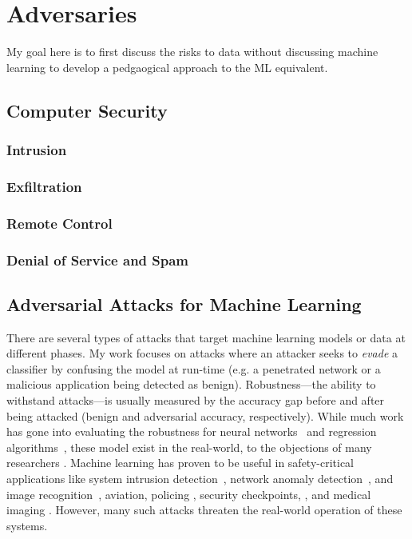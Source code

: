 \chapter{Adversaries}
My goal here is to first discuss the risks to data without discussing machine learning to develop a pedgaogical approach to the ML equivalent.
\section{Computer Security}
\lipsum[1-2]
\subsection{Intrusion}
\lipsum[1-2]
\subsection{Exfiltration}
\lipsum[1-2]
\subsection{Remote Control}
\lipsum[1-2]
\subsection{Denial of Service and Spam}
\lipsum[1-2]

\section{Adversarial Attacks for Machine Learning}
\label{sec:attacks}
There are several types of attacks that target machine learning models or data at different phases. My work focuses on attacks where an attacker seeks to \emph{evade} a classifier by confusing the model at run-time (e.g. a penetrated network or a malicious application being detected as benign). Robustness---the ability to withstand attacks---is usually measured by the accuracy gap before and after being attacked (benign and adversarial accuracy, respectively).  While much work has gone into evaluating the robustness for neural networks~\cite{deepfool,biggio_evasion_2013,carlini_towards_2017} and regression algorithms~\cite{deka2019adversarial}, these model exist in the real-world, to the objections of many researchers \cite{meyers2023safety,biggio_evasion_2013,carlini_towards_2017}. 
Machine learning has proven to be useful in safety-critical applications like system intrusion detection~\cite{kim2003network}, network anomaly detection~\cite{mehmood2015svm}, and image recognition~\cite{tzotsos2008support}, aviation\cite{ai_aviation}, policing \cite{ai_prison}, security checkpoints, \cite{ai_security}, and medical imaging \cite{ai_medical_imaging}. However, many such attacks threaten the real-world operation of these systems.

